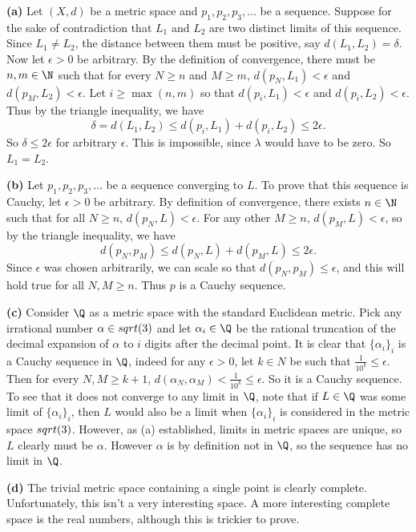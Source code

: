 \documentclass[11pt,letterpaper]{article}
\begin{document}
\begin{changemargin}{1em}{1em}
    \textbf{(a)} Let $(X, d)$ be a metric space and $p_1,p_2,p_3,\ldots$ be a sequence. Suppose for the sake of contradiction that $L_1$ and $L_2$ are two distinct limits of this sequence. Since $L_1\neq L_2$, the distance between them must be positive, say $d(L_1, L_2)=\delta$. Now let $\epsilon>0$ be arbitrary. By the definition of convergence, there must be $n,m\in \N$ such that for every $N \geq n$ and $M\geq m$, $d(p_N, L_1) < \epsilon$ and $d(p_M, L_2) < \epsilon$. Let $i \geq \max(n,m)$ so that $d(p_i, L_1)<\epsilon$ and $d(p_i, L_2)<\epsilon$. Thus by the triangle inequality, we have
     \[
        \delta = d(L_1, L_2) \leq d(p_i, L_1) + d(p_i, L_2) \leq 2\epsilon
    .\] 
    So $\delta\leq 2\epsilon$ for arbitrary $\epsilon$. This is impossible, since $\lambda$ would have to be zero. So $L_1=L_2$.

    \textbf{(b)} Let $p_1,p_2,p_3,\ldots$ be a sequence converging to $L$. To prove that this sequence is Cauchy, let $\epsilon > 0$ be arbitrary. By definition of convergence, there exists  $n\in \N$ such that for all  $N\geq n$,  $d(p_N, L) < \epsilon$. For any other  $M\geq n$,  $d(p_M, L) < \epsilon$, so by the triangle inequality, we have
    \[
        d(p_N, p_M) \leq d(p_N, L) + d(p_M, L) \leq 2\epsilon
    .\] 
    Since $\epsilon$ was chosen arbitrarily, we can scale so that $d(p_N, p_M)\leq \epsilon$, and this will hold true for all  $N, M\geq n$. Thus  $p$ is a Cauchy sequence.

    \textbf{(c)} Consider $\Q$ as a metric space with the standard Euclidean metric. Pick any irrational number $\alpha\in sqrt(3)$ and let $\alpha_i\in \Q$ be the rational truncation of the decimal expansion of $\alpha$ to $i$ digits after the decimal point. 
    It is clear that $\{\alpha_i\}_i$ is a Cauchy sequence in $\Q$, indeed for any $\epsilon > 0$, let $k\in N$ be such that $\frac{1}{10^k}\leq \epsilon$. 
    Then for every $N,M \geq k+1$, $d(\alpha_N, \alpha_M) < \frac{1}{10^k} \leq \epsilon$. So it is a Cauchy sequence. 
    To see that it does not converge to any limit in $\Q$, note that if $L\in \Q$ was some limit of $\{\alpha_i\}_i$, then $L$ would also be a limit when $\{\alpha_i\}_i$ is considered in the metric space  $sqrt(3)$. 
    However, as (a) established, limits in metric spaces are unique, so $L$ clearly must be  $\alpha$. However  $\alpha$ is by definition not in $\Q$, so the sequence has no limit in  $\Q$.

    \textbf{(d)} The trivial metric space containing a single point is clearly complete. Unfortunately, this isn't a very interesting space. A more interesting complete space is the real numbers, although this is trickier to prove.
\end{changemargin}
\end{document}
